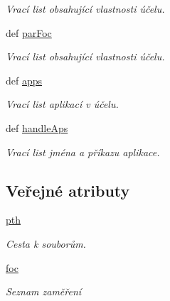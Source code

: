 \begin{DoxyCompactItemize}
\begin{DoxyCompactList}\small\item\em Vrací list obsahující vlastnosti účelu. \end{DoxyCompactList}\item 
def \hyperlink{classxmlFocPar_1_1xmlFocPar_acb64fb8d791eea8f81d3519d9cb05377}{par\-Foc}
\begin{DoxyCompactList}\small\item\em Vrací list obsahující vlastnosti účelu. \end{DoxyCompactList}\item 
def \hyperlink{classxmlFocPar_1_1xmlFocPar_a7bbeae70c79068740e0a933ca90fc887}{apps}
\begin{DoxyCompactList}\small\item\em Vrací list aplikací v účelu. \end{DoxyCompactList}\item 
def \hyperlink{classxmlFocPar_1_1xmlFocPar_a664f281540faa32cb196484a9cb2bfeb}{handle\-Aps}
\begin{DoxyCompactList}\small\item\em Vrací list jména a příkazu aplikace. \end{DoxyCompactList}\end{DoxyCompactItemize}
\subsection*{Veřejné atributy}
\begin{DoxyCompactItemize}
\item 
\hypertarget{classxmlFocPar_1_1xmlFocPar_ac86f256da6384fe1ed5ae182de266bcf}{\hyperlink{classxmlFocPar_1_1xmlFocPar_ac86f256da6384fe1ed5ae182de266bcf}{pth}}\label{db/ddc/classxmlFocPar_1_1xmlFocPar_ac86f256da6384fe1ed5ae182de266bcf}

\begin{DoxyCompactList}\small\item\em Cesta k souborům. \end{DoxyCompactList}\item 
\hypertarget{classxmlFocPar_1_1xmlFocPar_a7b380693eaa7349801d24cf74675a934}{\hyperlink{classxmlFocPar_1_1xmlFocPar_a7b380693eaa7349801d24cf74675a934}{foc}}\label{db/ddc/classxmlFocPar_1_1xmlFocPar_a7b380693eaa7349801d24cf74675a934}

\begin{DoxyCompactList}\small\item\em Seznam zaměření \end{DoxyCompactList}\end{DoxyCompactItemize}


